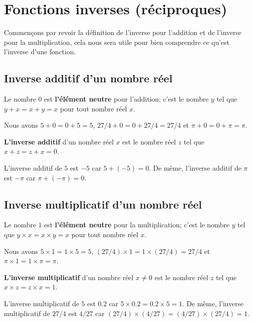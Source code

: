 {\section{Fonctions inverses (réciproques)}

Commençons par revoir la définition de l'inverse pour l'addition et
de l'inverse pour la multiplication, cela nous sera utile pour bien
comprendre ce qu'est l'inverse d'une fonction.

\subsection{Inverse additif d'un nombre réel}

Le nombre $0$ est {\bfseries l'élément neutre} 
pour l'addition; c'est le nombre $y$ tel que $y + x = x + y = x$ pour
tout nombre réel $x$.

\begin{egg} Nous avons $5+0=0+5=5$, $27/4 + 0 = 0 + 27/4 = 27/4$ et
$\pi+0 = 0 + \pi = \pi$.
\end{egg}

{\bfseries L'inverse additif}  
d'un nombre réel $x$ est le nombre réel $z$ tel que $x+z = z+x =0$.

\begin{egg} L'inverse additif de $5$ est $-5$ car $5 + (-5) = 0$.  De même,
l'inverse additif de $\pi$ est $-\pi$ car $\pi + (-\pi) = 0$.
\end{egg}

\subsection{Inverse multiplicatif d'un nombre réel}

Le nombre $1$ est {\bfseries l'élément neutre} 
pour la multiplication; c'est le nombre $y$ tel que $y \times x = x
\times y = x$ pour tout nombre réel $x$.

\begin{egg}
Nous avons $5\times 1= 1\times 5 = 5$,
$(27/4) \times 1 = 1 \times (27/4) = 27/4$
et $\pi \times 1 = 1 \times \pi = \pi$.
\end{egg}

{\bfseries L'inverse multiplicatif}
d'un nombre réel $x \neq 0$ est le nombre réel $z$ tel que
$x \times z = z \times x = 1$.

\begin{egg}
L'inverse multiplicatif de $5$ est $0.2$ car
$5 \times 0.2 = 0.2 \times 5 = 1$.  De même, l'inverse multiplicatif
de $27/4$ est $4/27$ car $(27/4) \times (4/27) = (4/27) \times (27/4) = 1$.
\end{egg}

}
